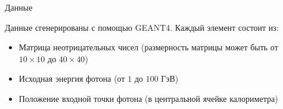 \documentclass[9pt]{beamer}
\begin{document}
\begin{frame}{Данные}
    \begin{block}{}
        Данные сгенерированы с помощью GEANT4. Каждый элемент состоит из:
        \begin{itemize}
            \item Матрица неотрицательных чисел (размерность матрицы  может быть от $10 \times 10$ до $40 \times 40$)
            \item Исходная энергия фотона (от $1$ до $100$ ГэВ)
            \item Положение входной точки фотона (в центральной ячейке калориметра)
        \end{itemize}
    \end{block}

    \begin{figure}
        \centering
        \hskip4pt
    \end{figure}
\end{frame}
\end{document}

